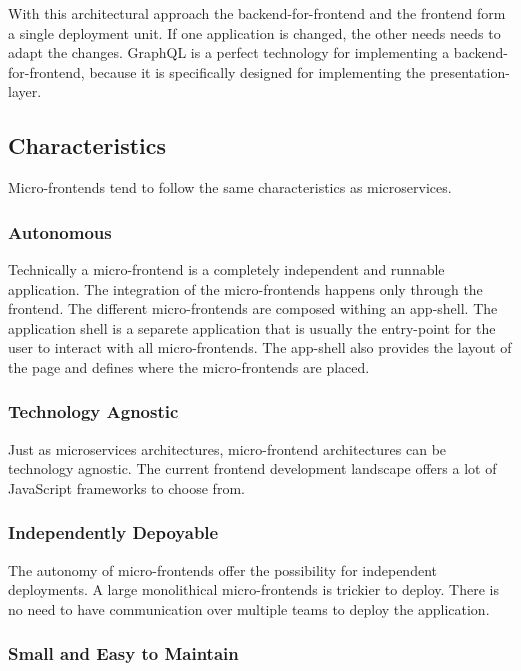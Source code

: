 With this architectural approach the backend-for-frontend and the frontend form a single deployment unit. If one application is changed, the other needs needs to adapt the changes. GraphQL is a perfect technology for implementing a backend-for-frontend, because it is specifically designed for implementing the presentation-layer.

\subsection{Characteristics}

Micro-frontends tend to follow the same characteristics as microservices.

\subsubsection{Autonomous}

Technically a micro-frontend is a completely independent and runnable application.
The integration of the micro-frontends happens only through the frontend. The different micro-frontends are composed withing an app-shell. The application shell is a separete application that is usually the entry-point for the user to interact with all micro-frontends. The app-shell also provides the layout of the page and defines where the micro-frontends are placed.

\subsubsection{Technology Agnostic}

Just as microservices architectures, micro-frontend architectures can be technology agnostic. The current frontend development landscape offers a lot of JavaScript frameworks to choose from.

\subsubsection{Independently Depoyable}

The autonomy of micro-frontends offer the possibility for independent deployments. A large monolithical micro-frontends is trickier to deploy. There is no need to have communication over multiple teams to deploy the application.


\subsubsection{Small and Easy to Maintain}




